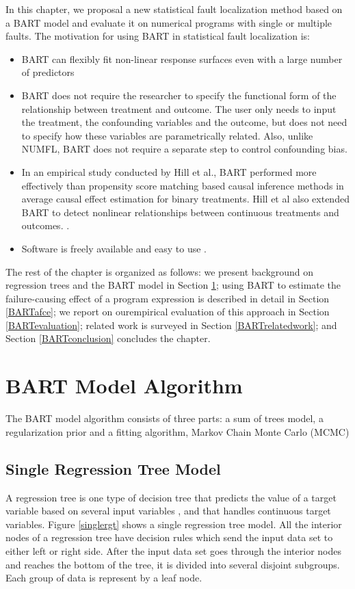 In this chapter, we proposal a new statistical fault localization method based on a BART model and evaluate it on numerical programs with single or multiple faults. The motivation for using BART in statistical fault localization is:
\vspace{-0.2cm}
\begin{itemize}
\item BART can flexibly fit non-linear response surfaces even with a large number of predictors
\item BART does not require the researcher to specify the functional form of the relationship between treatment and outcome. The user only needs to input the treatment, the confounding variables and the outcome, but does not need to specify how these variables are parametrically related. Also, unlike NUMFL, BART does not require a separate step to control confounding bias.
\item In an empirical study conducted by Hill et al., BART performed more effectively than propensity score matching based causal inference methods in average causal effect estimation for binary treatments. Hill et al also extended BART to detect nonlinear relationships between continuous treatments and outcomes. \cite{hill2012bayesian, hill2013assessing}.
\item Software is freely available and easy to use \cite{BARTMachine}.
\end{itemize}

The rest of the chapter is organized as follows: we present background on regression trees and the BART model in Section \ref{BARTbg}; using BART to estimate the failure-causing effect of a program expression is described in detail in Section \ref{BARTafce};  we report on ourempirical evaluation of this approach in Section \ref{BARTevaluation}; related work is surveyed in Section \ref{BARTrelatedwork}; and Section \ref{BARTconclusion} concludes the chapter.

\section{BART Model Algorithm}\label{BARTbg}%
The BART model algorithm consists of three parts: a sum of trees model, a regularization prior and a fitting algorithm, Markov Chain Monte Carlo (MCMC)
\subsection{Single Regression Tree Model}
A regression tree is one type of decision tree that predicts the value of a target variable based on several input variables \cite{loh2011classification}, and that handles continuous target variables. Figure \ref{singlergt} shows a single regression tree model. All the interior nodes of a regression tree have decision rules which send the input data set to either left or right side. After the input data set goes through the interior nodes and reaches the bottom of the tree, it is divided into several disjoint subgroups. Each group of data is represent by a leaf node.

